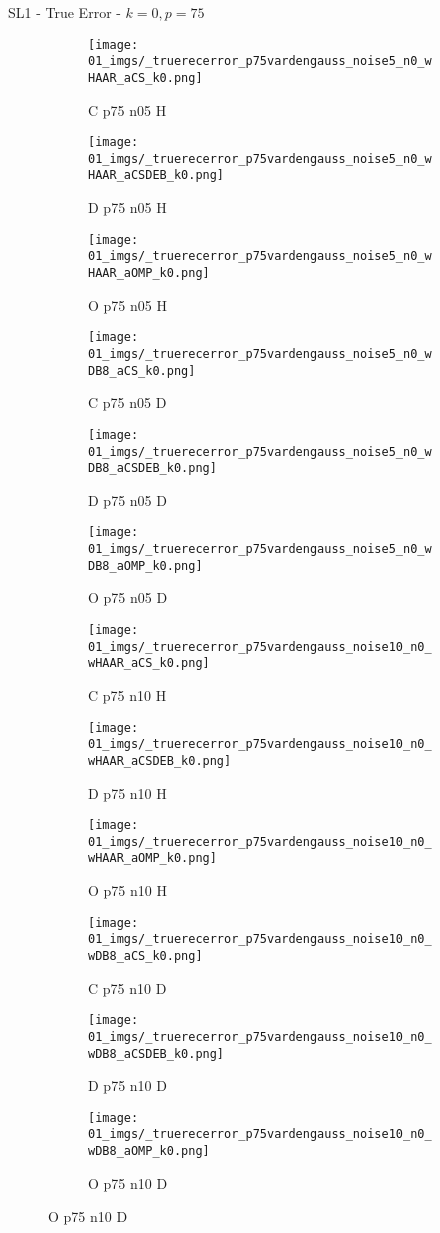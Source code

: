 \begin{frame}{SL1 - True Error - $k=0,p=75$}{}
\begin{figure}
\begin{subfigure}{0.13\textwidth}
\texttt{[image: 01\_imgs/\_truerecerror\_p75vardengauss\_noise5\_n0\_wHAAR\_aCS\_k0.png]}
\caption*{\tiny C p75 n05 H}
\end{subfigure}
\begin{subfigure}{0.13\textwidth}
\texttt{[image: 01\_imgs/\_truerecerror\_p75vardengauss\_noise5\_n0\_wHAAR\_aCSDEB\_k0.png]}
\caption*{\tiny D p75 n05 H}
\end{subfigure}
\begin{subfigure}{0.13\textwidth}
\texttt{[image: 01\_imgs/\_truerecerror\_p75vardengauss\_noise5\_n0\_wHAAR\_aOMP\_k0.png]}
\caption*{\tiny O p75 n05 H}
\end{subfigure}
\begin{subfigure}{0.13\textwidth}
\texttt{[image: 01\_imgs/\_truerecerror\_p75vardengauss\_noise5\_n0\_wDB8\_aCS\_k0.png]}
\caption*{\tiny C p75 n05 D}
\end{subfigure}
\begin{subfigure}{0.13\textwidth}
\texttt{[image: 01\_imgs/\_truerecerror\_p75vardengauss\_noise5\_n0\_wDB8\_aCSDEB\_k0.png]}
\caption*{\tiny D p75 n05 D}
\end{subfigure}
\begin{subfigure}{0.13\textwidth}
\texttt{[image: 01\_imgs/\_truerecerror\_p75vardengauss\_noise5\_n0\_wDB8\_aOMP\_k0.png]}
\caption*{\tiny O p75 n05 D}
\end{subfigure}

\vspace{5pt}

\begin{subfigure}{0.13\textwidth}
\texttt{[image: 01\_imgs/\_truerecerror\_p75vardengauss\_noise10\_n0\_wHAAR\_aCS\_k0.png]}
\caption*{\tiny C p75 n10 H}
\end{subfigure}
\begin{subfigure}{0.13\textwidth}
\texttt{[image: 01\_imgs/\_truerecerror\_p75vardengauss\_noise10\_n0\_wHAAR\_aCSDEB\_k0.png]}
\caption*{\tiny D p75 n10 H}
\end{subfigure}
\begin{subfigure}{0.13\textwidth}
\texttt{[image: 01\_imgs/\_truerecerror\_p75vardengauss\_noise10\_n0\_wHAAR\_aOMP\_k0.png]}
\caption*{\tiny O p75 n10 H}
\end{subfigure}
\begin{subfigure}{0.13\textwidth}
\texttt{[image: 01\_imgs/\_truerecerror\_p75vardengauss\_noise10\_n0\_wDB8\_aCS\_k0.png]}
\caption*{\tiny C p75 n10 D}
\end{subfigure}
\begin{subfigure}{0.13\textwidth}
\texttt{[image: 01\_imgs/\_truerecerror\_p75vardengauss\_noise10\_n0\_wDB8\_aCSDEB\_k0.png]}
\caption*{\tiny D p75 n10 D}
\end{subfigure}
\begin{subfigure}{0.13\textwidth}
\texttt{[image: 01\_imgs/\_truerecerror\_p75vardengauss\_noise10\_n0\_wDB8\_aOMP\_k0.png]}
\caption*{\tiny O p75 n10 D}
\end{subfigure}


\end{figure}
\end{frame}
